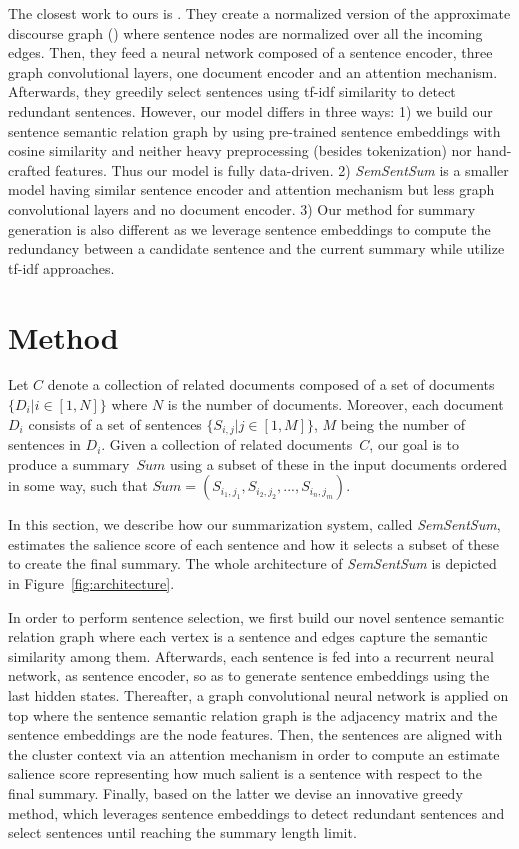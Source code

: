 \documentclass{article}
\begin{document}
The closest work to ours is \citet{Yasunaga17}. They create a normalized version of the approximate discourse graph (\citet{christensen2013towards}) where sentence nodes are normalized over all the incoming edges. Then, they feed a neural network composed of a sentence encoder, three graph convolutional layers, one document encoder and an attention mechanism. Afterwards, they greedily select sentences using tf-idf similarity to detect redundant sentences. However, our model differs in three ways: 1) we build our sentence semantic relation graph by using pre-trained sentence embeddings with cosine similarity and neither heavy preprocessing (besides tokenization) nor hand-crafted features. Thus our model is fully data-driven. 2) \textit{SemSentSum} is a smaller model having similar sentence encoder and attention mechanism but less graph convolutional layers and no document encoder. 3) Our method for summary generation is also different as we leverage sentence embeddings to compute the redundancy between a candidate sentence and the current summary while \citet{Yasunaga17, hong2014improving, cao2015ranking, CaoLLW17} utilize tf-idf approaches.

\section{Method}
\label{sec:method}
Let $C$ denote a collection of related documents composed of a set of documents~$\{D_i|i \in [1,N]\}$ where $N$ is the number of documents. Moreover, each document~$D_i$ consists of a set of sentences $\{S_{i,j}|j \in [1,M]\}$, $M$ being the number of sentences in $D_i$. Given a collection of related documents~$C$, our goal is to produce a summary~$Sum$ using a subset of these in the input documents ordered in some way, such that $Sum = (S_{i_1,j_1},S_{i_2,j_2},...,S_{i_n,j_m})$. 

In this section, we describe how our summarization system, called \textit{SemSentSum}, estimates the salience score of each sentence and how it selects a subset of these to create the final summary. The whole architecture of \textit{SemSentSum} is depicted in Figure~\ref{fig:architecture}.

In order to perform sentence selection, we first build our novel sentence semantic relation graph where each vertex is a sentence and edges capture the semantic similarity among them. Afterwards, each sentence is fed into a recurrent neural network, as sentence encoder, so as to generate sentence embeddings using the last hidden states. Thereafter, a graph convolutional neural network is applied on top where the sentence semantic relation graph is the adjacency matrix and the sentence embeddings are the node features. Then, the sentences are aligned with the cluster context via an attention mechanism in order to compute an estimate salience score representing how much salient is a sentence with respect to the final summary. Finally, based on the latter we devise an innovative greedy method, which leverages sentence embeddings to detect redundant sentences and select sentences until reaching the summary length limit. 
\end{document}

